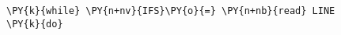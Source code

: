 \begin{Verbatim}[commandchars=\\\{\}]
\PY{k}{while} \PY{n+nv}{IFS}\PY{o}{=} \PY{n+nb}{read} LINE
\PY{k}{do}
\end{Verbatim}
